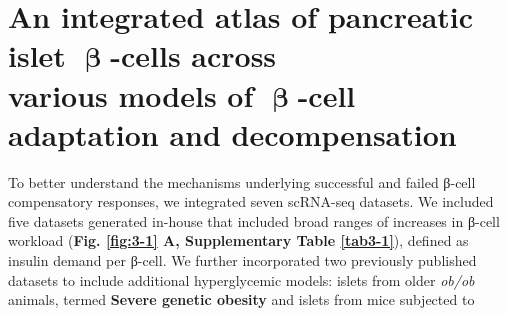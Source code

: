 




\clearpage

\section{An integrated atlas of pancreatic islet \( \mathbf{\upbeta} \)-cells across\\various models of \( \mathbf{\upbeta} \)-cell adaptation and decompensation}
\label{sec:int_atlas}
To better understand the mechanisms underlying successful and failed β-cell compensatory responses, we integrated seven scRNA-seq datasets. We included five datasets generated in-house that included broad ranges of increases in β-cell workload (\textbf{Fig. \ref{fig:3-1} A, Supplementary Table \ref{tab3-1}}), defined as insulin demand per β-cell. We further incorporated two previously published datasets to include  additional hyperglycemic models: islets from older \textit{ob/ob} animals, termed \textbf{Severe genetic obesity} \textbf{\cite{chung_endocrine-exocrine_2020}} and islets from mice subjected to 



